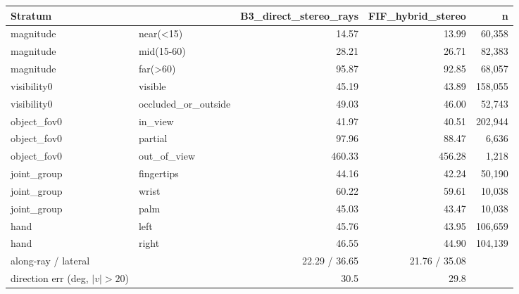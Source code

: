 \begin{tabular}{llrrr}
\toprule
Stratum & & B3\_direct\_stereo\_rays & FIF\_hybrid\_stereo & n \\
\midrule
magnitude & near(<15) & 14.57 & 13.99 & 60,358 \\
magnitude & mid(15-60) & 28.21 & 26.71 & 82,383 \\
magnitude & far(>60) & 95.87 & 92.85 & 68,057 \\
visibility0 & visible & 45.19 & 43.89 & 158,055 \\
visibility0 & occluded\_or\_outside & 49.03 & 46.00 & 52,743 \\
object\_fov0 & in\_view & 41.97 & 40.51 & 202,944 \\
object\_fov0 & partial & 97.96 & 88.47 & 6,636 \\
object\_fov0 & out\_of\_view & 460.33 & 456.28 & 1,218 \\
joint\_group & fingertips & 44.16 & 42.24 & 50,190 \\
joint\_group & wrist & 60.22 & 59.61 & 10,038 \\
joint\_group & palm & 45.03 & 43.47 & 10,038 \\
hand & left & 45.76 & 43.95 & 106,659 \\
hand & right & 46.55 & 44.90 & 104,139 \\
\midrule
along-ray / lateral & & 22.29 / 36.65 & 21.76 / 35.08 & \\
direction err (deg, $|v|>20$) & & 30.5 & 29.8 & \\
\bottomrule
\end{tabular}
